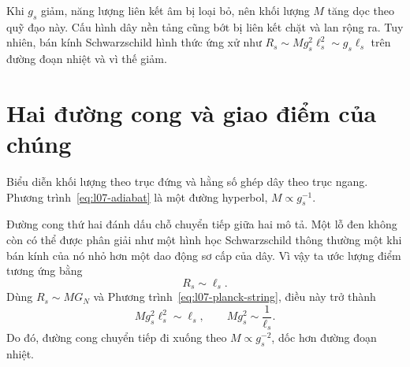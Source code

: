 Khi \(g_s\) giảm, năng lượng liên kết âm bị loại bỏ, nên khối lượng \(M\) tăng dọc theo quỹ đạo này. Cấu hình dây nền tảng cũng bớt bị liên kết chặt và lan rộng ra. Tuy nhiên, bán kính Schwarzschild hình thức ứng xử như \(R_s\sim Mg_s^2\ell_s^2\sim g_s\ell_s\) trên đường đoạn nhiệt và vì thế giảm.

\begin{classroomqa}
\end{classroomqa}

\section{Hai đường cong và giao điểm của chúng}

Biểu diễn khối lượng theo trục đứng và hằng số ghép dây theo trục ngang. Phương trình~\eqref{eq:l07-adiabat} là một đường hyperbol, \(M\propto g_s^{-1}\).

\begin{classroomqa}
\end{classroomqa}

Đường cong thứ hai đánh dấu chỗ chuyển tiếp giữa hai mô tả. Một lỗ đen không còn có thể được phân giải như một hình học Schwarzschild thông thường một khi bán kính của nó nhỏ hơn một dao động sơ cấp của dây. Vì vậy ta ước lượng điểm tương ứng bằng
\begin{equation}
R_s\sim\ell_s.
\label{eq:l07-correspondence-radius}
\end{equation}
Dùng \(R_s\sim MG_N\) và Phương trình~\eqref{eq:l07-planck-string}, điều này trở thành
\begin{equation}
Mg_s^2\ell_s^2\sim\ell_s,
\qquad
Mg_s^2\sim\frac{1}{\ell_s}.
\label{eq:l07-transition-curve}
\end{equation}
Do đó, đường cong chuyển tiếp đi xuống theo \(M\propto g_s^{-2}\), dốc hơn đường đoạn nhiệt.

